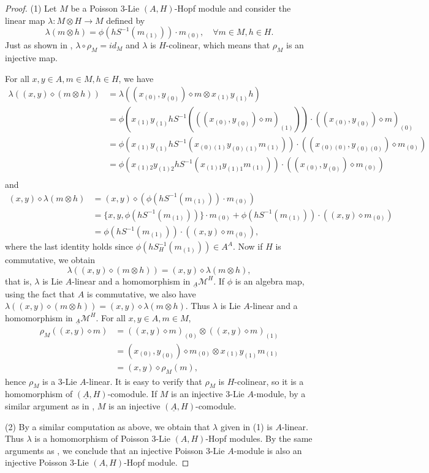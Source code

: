 \documentclass[11pt]{article}
\def\di{\diamond}
\def\ot{\otimes}
\begin{document}
\begin{proof}
(1) Let $M$ be a Poisson 3-Lie $(A, H)$-Hopf module and consider the linear map $\lambda:M\ot H\rightarrow M$ defined by
$$\lambda(m\ot h)=\phi(hS^{-1}(m_{(1)}))\cdot m_{(0)},\quad \forall m\in M,h\in H.$$
Just as shown in \cite{Gu}, $\lambda\circ\rho_M=id_M$ and $\lambda$ is $H$-colinear, which means that $\rho_M$ is an injective map. 

For all $x,y\in A,m\in M,h\in H$, we have
\begin{align*}
\lambda((x,y)\di (m\ot h))&=\lambda((x_{(0)},y_{(0)})\di m\ot x_{(1)}y_{(1)}h)\\
&=\phi(x_{(1)}y_{(1)}hS^{-1}(((x_{(0)},y_{(0)})\di m)_{(1)}))\cdot ((x_{(0)},y_{(0)})\di m)_{(0)}\\
&=\phi(x_{(1)}y_{(1)}hS^{-1}(x_{(0)(1)}y_{(0)(1)} m_{(1)}))\cdot ((x_{(0)(0)},y_{(0)(0)})\di m_{(0)})\\
&=\phi(x_{(1)2}y_{(1)2}hS^{-1}(x_{(1)1}y_{(1)1} m_{(1)}))\cdot ((x_{(0)},y_{(0)})\di m_{(0)})\\
\end{align*}
and
\begin{align*}
(x,y)\di\lambda(m\ot h)&=(x,y)\di(\phi(hS^{-1}(m_{(1)}))\cdot m_{(0)})\\
&=\{x,y,\phi(hS^{-1}(m_{(1)}))\}\cdot m_{(0)}+\phi(hS^{-1}(m_{(1)}))\cdot((x,y)\di m_{(0)})\\
&=\phi(hS^{-1}(m_{(1)}))\cdot((x,y)\di m_{(0)}),
\end{align*}
where the last identity holds since $\phi(hS^{-1}_H(m_{(1)}))\in A^A$. Now if $H$ is commutative, we obtain
$$\lambda((x,y)\di (m\ot h))=(x,y)\di\lambda(m\ot h),$$
that is, $\lambda$ is Lie $A$-linear and a homomorphism in $_{\underline{A}}\mathcal{M}^H$. If $\phi$ is an algebra map, using the fact that $A$ is commutative, we also have $\lambda((x,y)\di (m\ot h))=(x,y)\di\lambda(m\ot h).$ Thus $\lambda$ is Lie $A$-linear and a homomorphism in $_{\underline{A}}\mathcal{M}^H$. For all $x,y\in A,m\in M$,
\begin{align*}
\rho_M((x,y)\di m)&=((x,y)\di m)_{(0)}\ot((x,y)\di m)_{(1)}\\
&=(x_{(0)},y_{(0)})\di m_{(0)}\ot x_{(1)}y_{(1)} m_{(1)}\\
&=(x,y)\di \rho_M(m),
\end{align*}
hence $\rho_M$ is a 3-Lie $A$-linear.
 It is easy to verify that $\rho_M$ is $H$-colinear, so it is a homomorphism of $(\underline{A},H)$-comodule. If $M$ is an injective 3-Lie $A$-module, by a similar argument as in \cite{Gu}, $M$ is an injective $(\underline{A},H)$-comodule.

(2) By a similar computation as above, we obtain that $\lambda$ given in (1) is $A$-linear. Thus $\lambda$ is a homomorphism of Poisson 3-Lie $(A, H)$-Hopf modules. By the same arguments as \cite{Gu}, we conclude that an injective Poisson 3-Lie $A$-module is also an injective Poisson 3-Lie $(A,H)$-Hopf module.
\end{proof}
\end{document}
